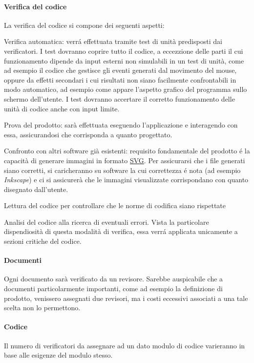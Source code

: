 \paragraph{Verifica del codice}
La verifica del codice si compone dei seguenti aspetti:
\begin{elenconumerato}[\textbf{}]{\subsubsecindent}
\item Verifica automatica: verr\'a effettuata tramite test di unit\`a predisposti dai verificatori. I test dovranno coprire tutto il codice, a eccezzione delle parti il cui funzionamento dipende da input esterni non simulabili in un test di unit\`a, come ad esempio il codice che gestisce gli eventi generati dal movimento del mouse, oppure da effetti secondari i cui risultati non siano facilmente confrontabili in modo automatico, ad esempio come appare l'aspetto grafico del programma sullo schermo dell'utente. I test dovranno accertare il corretto funzionamento delle unit\`a di codice anche con input limite.
\item Prova del prodotto: sar\`a effettuata eseguendo l'applicazione e interagendo con essa, assicurandosi che corrisponda a quanto progettato.
\item Confronto con altri software gi\`a esistenti: requisito fondamentale del prodotto \'e la capacit\`a di generare immagini in formato \underline{SVG}. Per assicurarsi che i file generati siano corretti, si caricheranno su software la cui correttezza \'e nota (ad esempio \textit{Inkscape}) e ci si assicurer\`a che le immagini visualizzate corrispondano con quanto disegnato dall'utente. 
\item Lettura del codice per controllare che le norme di codifica siano rispettate
\item Analisi del codice alla ricerca di eventuali errori. Vista la particolare dispendiosit\`a di questa modalit\`a di verifica, essa verr\'a applicata unicamente a sezioni critiche del codice.
\end{elenconumerato}


\paragraph{Documenti} Ogni documento sar\`a verificato da un revisore. Sarebbe auspicabile che a documenti particolarmente importanti, come ad esempio la definizione di prodotto, venissero assegnati due revisori, ma i costi eccessivi associati a una tale scelta non lo permettono.
\paragraph{Codice} Il numero di verificatori da assegnare ad un dato modulo di codice varieranno in base alle esigenze del modulo stesso.

